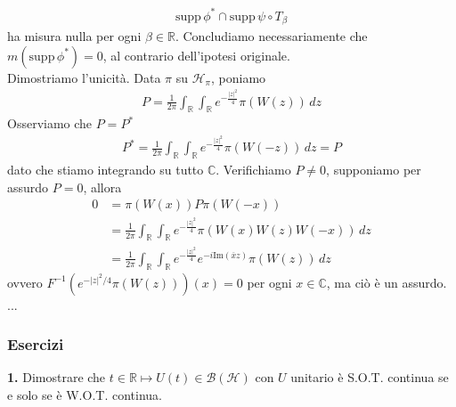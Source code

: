 \documentclass{article}
\numberwithin{equation}{subsection}
\begin{document}
\begin{align*}
    \mathrm{supp} \, \phi^* \cap \mathrm{supp} \, \psi \circ T_\beta
\end{align*}
ha misura nulla per ogni $\beta \in \mathbb{R}$. Concludiamo necessariamente che $m(\mathrm{supp} \, \phi^*) = 0$, al contrario dell'ipotesi originale. \\
Dimostriamo l'unicità. Data $\pi$ su $\mathcal{H}_\pi$, poniamo
\begin{align*}
    P = \frac{1}{2\pi}\int_{\mathbb{R}}\int_{\mathbb{R}} e^{-\frac{|z|^2}{4}}\pi(W(z)) \, dz
\end{align*}
Osserviamo che $P = P^*$
\begin{align*}
    P^* = \frac{1}{2\pi}\int_{\mathbb{R}}\int_{\mathbb{R}} e^{-\frac{|z|^2}{4}}\pi(W(-z)) \, dz = P
\end{align*}
dato che stiamo integrando su tutto $\mathbb{C}$. Verifichiamo $P \neq 0$, supponiamo per assurdo $P = 0$, allora
\begin{align*}
    0 &= \pi(W(x))P\pi(W(-x)) \\
    &= \frac{1}{2\pi}\int_{\mathbb{R}}\int_{\mathbb{R}} e^{-\frac{|z|^2}{4}}\pi(W(x)W(z)W(-x)) \, dz \\
    &= \frac{1}{2\pi}\int_{\mathbb{R}}\int_{\mathbb{R}} e^{-\frac{|z|^2}{4}}e^{-i\mathrm{Im}(\overline{x}z)}\pi(W(z)) \, dz
\end{align*}
ovvero $F^{-1}(e^{-|z|^2/4}\pi(W(z)))(x) = 0$ per ogni $x \in \mathbb{C}$, ma ciò è un assurdo. ...

\subsubsection{Esercizi}
\textbf{1.} Dimostrare che $t \in \mathbb{R} \mapsto U(t) \in \mathcal{B}(\mathcal{H})$ con $U$ unitario è S.O.T. continua se e solo se è W.O.T. continua. \\
\end{document}
